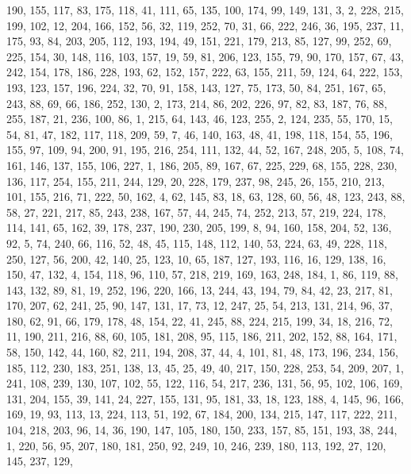 \begin{DoxyCode}
       190, 155, 117, 83, 175, 118, 41, 111, 65, 135, 100, 174, 99, 149, 131, 3, 2, 228, 215, 199, 102, 12, 204, 166,
       152, 56, 32, 119, 252, 70, 31, 66, 222, 246, 36, 195, 237, 11, 175, 93, 84, 203, 205, 112, 193, 194, 49,
       151, 221, 179, 213, 85, 127, 99, 252, 69, 225, 154, 30, 148, 116, 103, 157, 19, 59, 81, 206, 123, 155, 79, 90,
       170, 157, 67, 43, 242, 154, 178, 186, 228, 193, 62, 152, 157, 222, 63, 155, 211, 59, 124, 64, 222, 153,
       193, 123, 157, 196, 224, 32, 70, 91, 158, 143, 127, 75, 173, 50, 84, 251, 167, 65, 243, 88, 69, 66, 186, 252,
       130, 2, 173, 214, 86, 202, 226, 97, 82, 83, 187, 76, 88, 255, 187, 21, 236, 100, 86, 1, 215, 64, 143, 46,
       123, 255, 2, 124, 235, 55, 170, 15, 54, 81, 47, 182, 117, 118, 209, 59, 7, 46, 140, 163, 48, 41, 198, 118, 154,
       55, 196, 155, 97, 109, 94, 200, 91, 195, 216, 254, 111, 132, 44, 52, 167, 248, 205, 5, 108, 74, 161, 146,
       137, 155, 106, 227, 1, 186, 205, 89, 167, 67, 225, 229, 68, 155, 228, 230, 136, 117, 254, 155, 211, 244, 129,
       20, 228, 179, 237, 98, 245, 26, 155, 210, 213, 101, 155, 216, 71, 222, 50, 162, 4, 62, 145, 83, 18, 63,
       128, 60, 56, 48, 123, 243, 88, 58, 27, 221, 217, 85, 243, 238, 167, 57, 44, 245, 74, 252, 213, 57, 219, 224,
       178, 114, 141, 65, 162, 39, 178, 237, 190, 230, 205, 199, 8, 94, 160, 158, 204, 52, 136, 92, 5, 74, 240, 66,
       116, 52, 48, 45, 115, 148, 112, 140, 53, 224, 63, 49, 228, 118, 250, 127, 56, 200, 42, 140, 25, 123, 10, 65,
       187, 127, 193, 116, 16, 129, 138, 16, 150, 47, 132, 4, 154, 118, 96, 110, 57, 218, 219, 169, 163, 248, 184,
       1, 86, 119, 88, 143, 132, 89, 81, 19, 252, 196, 220, 166, 13, 244, 43, 194, 79, 84, 42, 23, 217, 81, 170,
       207, 62, 241, 25, 90, 147, 131, 17, 73, 12, 247, 25, 54, 213, 131, 214, 96, 37, 180, 62, 91, 66, 179, 178, 48,
       154, 22, 41, 245, 88, 224, 215, 199, 34, 18, 216, 72, 11, 190, 211, 216, 88, 60, 105, 181, 208, 95, 115,
       186, 211, 202, 152, 88, 164, 171, 58, 150, 142, 44, 160, 82, 211, 194, 208, 37, 44, 4, 101, 81, 48, 173, 196,
       234, 156, 185, 112, 230, 183, 251, 138, 13, 45, 25, 49, 40, 217, 150, 228, 253, 54, 209, 207, 1, 241, 108,
       239, 130, 107, 102, 55, 122, 116, 54, 217, 236, 131, 56, 95, 102, 106, 169, 131, 204, 155, 39, 141, 24, 227,
       155, 131, 95, 181, 33, 18, 123, 188, 4, 145, 96, 166, 169, 19, 93, 113, 13, 224, 113, 51, 192, 67, 184, 200,
       134, 215, 147, 117, 222, 211, 104, 218, 203, 96, 14, 36, 190, 147, 105, 180, 150, 233, 157, 85, 151, 193,
       38, 244, 1, 220, 56, 95, 207, 180, 181, 250, 92, 249, 10, 246, 239, 180, 113, 192, 27, 120, 145, 237, 129,

\end{DoxyCode}
